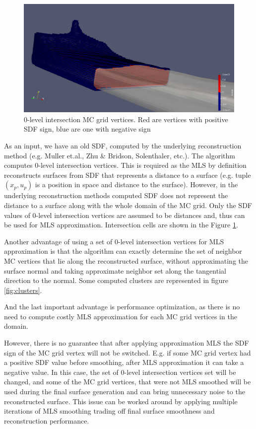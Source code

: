 \begin{figure}[H]
	\begin{center}
		\includegraphics[width=\textwidth]{figures/MlsIntersectionVertexSet.png}
	\end{center}
	\caption{0-level intersection MC grid vertices. Red are vertices with positive SDF sign, blue are one with negative sign}
	\label{fig:intersection_vertices}
\end{figure}
As an input, we have an old SDF, computed by the underlying reconstruction method (e.g. Muller et.al., Zhu \& Bridson, Solenthaler, etc.). The algorithm computes 0-level intersection vertices. This is required as the MLS by definition reconstructs surfaces from SDF that represents a distance to a surface (e.g. tuple $(x_p, u_p)$ is a position in space and distance to the surface). However, in the underlying reconstruction methods computed SDF does not represent the distance to a surface along with the whole domain of the MC grid. Only the SDF values of 0-level intersection vertices are assumed to be distances and, thus can be used for MLS approximation. Intersection cells are shown in the Figure \ref{fig:intersection_vertices}.


Another advantage of using a set of 0-level intersection vertices for MLS approximation is that the algorithm can exactly determine the set of neighbor MC vertices that lie along the reconstructed surface, without approximating the surface normal and taking approximate neighbor set along the tangential direction to the normal. Some computed clusters are represented in figure \ref{fig:clusters}.


And the last important advantage is performance optimization, as there is no need to compute costly MLS approximation for each MC grid vertices in the domain.


However, there is no guarantee that after applying approximation MLS the SDF sign of the MC grid vertex will not be switched. E.g. if some MC grid vertex had a positive SDF value before smoothing, after MLS approximation it can take a negative value. In this case, the set of 0-level intersection vertices set will be changed, and some of the MC grid vertices, that were not MLS smoothed will be used during the final surface generation and can bring unnecessary noise to the reconstructed surface. This issue can be worked around by applying multiple iterations of MLS smoothing trading off final surface smoothness and reconstruction performance.

